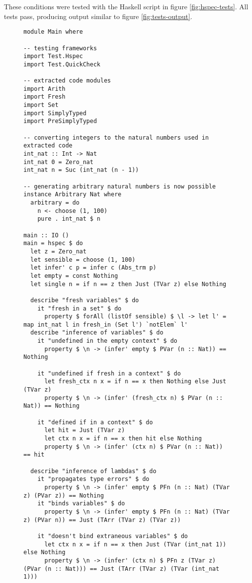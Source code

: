 These conditions were tested with the Haskell script in figure \ref{fig:hspec-tests}.
All tests pass, producing output similar to figure \ref{fig:tests-output}.
\begin{figure}
\begin{verbatim}
module Main where

-- testing frameworks
import Test.Hspec
import Test.QuickCheck

-- extracted code modules
import Arith
import Fresh
import Set
import SimplyTyped
import PreSimplyTyped

-- converting integers to the natural numbers used in extracted code
int_nat :: Int -> Nat
int_nat 0 = Zero_nat
int_nat n = Suc (int_nat (n - 1))

-- generating arbitrary natural numbers is now possible
instance Arbitrary Nat where
  arbitrary = do
    n <- choose (1, 100)
    pure . int_nat $ n

main :: IO ()
main = hspec $ do
  let z = Zero_nat
  let sensible = choose (1, 100)
  let infer' c p = infer c (Abs_trm p)
  let empty = const Nothing
  let single n = if n == z then Just (TVar z) else Nothing

  describe "fresh variables" $ do
    it "fresh in a set" $ do
      property $ forAll (listOf sensible) $ \l -> let l' = map int_nat l in fresh_in (Set l') `notElem` l'
  describe "inference of variables" $ do
    it "undefined in the empty context" $ do
      property $ \n -> (infer' empty $ PVar (n :: Nat)) == Nothing

    it "undefined if fresh in a context" $ do
      let fresh_ctx n x = if n == x then Nothing else Just (TVar z) 
      property $ \n -> (infer' (fresh_ctx n) $ PVar (n :: Nat)) == Nothing

    it "defined if in a context" $ do
      let hit = Just (TVar z)
      let ctx n x = if n == x then hit else Nothing
      property $ \n -> (infer' (ctx n) $ PVar (n :: Nat)) == hit

  describe "inference of lambdas" $ do
    it "propagates type errors" $ do
      property $ \n -> (infer' empty $ PFn (n :: Nat) (TVar z) (PVar z)) == Nothing
    it "binds variables" $ do
      property $ \n -> (infer' empty $ PFn (n :: Nat) (TVar z) (PVar n)) == Just (TArr (TVar z) (TVar z))

    it "doesn't bind extraneous variables" $ do
      let ctx n x = if n == x then Just (TVar (int_nat 1)) else Nothing
      property $ \n -> (infer' (ctx n) $ PFn z (TVar z) (PVar (n :: Nat))) == Just (TArr (TVar z) (TVar (int_nat 1)))


\end{verbatim}
\end{figure}
